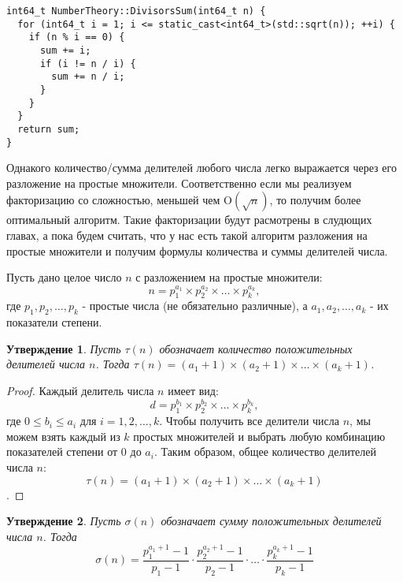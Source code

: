 \documentclass[12pt, a4paper, openany]{book}
\newtheorem*{statement}{Утверждение}
\begin{document}
\newpage
\begin{lstlisting}[breaklines=true]
int64_t NumberTheory::DivisorsSum(int64_t n) {
  for (int64_t i = 1; i <= static_cast<int64_t>(std::sqrt(n)); ++i) {
    if (n % i == 0) {
      sum += i;
      if (i != n / i) {
        sum += n / i;
      }
    }
  }
  return sum;
}
\end{lstlisting}

Однакого количество/сумма делителей любого числа легко выражается через его разложение на простые множители. Соответственно если мы реализуем факторизацию со сложностью, меньшей чем $\text{O}(\sqrt{n})$, то получим более оптимальный алгоритм. Такие факторизации будут расмотрены в слудющих главах, а пока будем считать, что у нас есть такой алгоритм разложения на простые множители и получим формулы количества и суммы делителей числа.

\noindent
Пусть дано целое число $ n $ с разложением на простые множители:
\[n = p_1^{a_1} \times p_2^{a_2} \times \ldots \times p_k^{a_k},\]
\noindent
где $ p_1, p_2, \ldots, p_k $ - простые числа (не обязательно различные), а $ a_1, a_2, \ldots, a_k $ - их показатели степени.

\begin{statement}
Пусть $\tau(n)$ обозначает количество положительных делителей числа $n$. Тогда $\tau(n) = (a_1 + 1) \times (a_2 + 1) \times \ldots \times (a_k + 1)$.
\end{statement}

\begin{proof}
Каждый делитель числа $ n $ имеет вид:
\[ d = p_1^{b_1} \times p_2^{b_2} \times \ldots \times p_k^{b_k},\]
\noindent
где $ 0 \leq b_i \leq a_i $ для $ i = 1, 2, \ldots, k $. Чтобы получить все делители числа $ n $, мы можем взять каждый из $ k $ простых множителей и выбрать любую комбинацию показателей степени от 0 до $ a_i $. Таким образом, общее количество делителей числа $ n $:
\begin{equation}\tau(n) = (a_1 + 1) \times (a_2 + 1) \times \ldots \times (a_k + 1)\end{equation}.
\end{proof}

\newpage

\begin{statement}
Пусть $\sigma(n)$ обозначает сумму положительных делителей числа $n$. Тогда \begin{equation}
\sigma(n) = \frac{{p_1^{a_1+1} - 1}}{{p_1 - 1}} \cdot \frac{{p_2^{a_2+1} - 1}}{{p_2 - 1}} \cdot \ldots \cdot \frac{{p_k^{a_k+1} - 1}}{{p_k - 1}}
\end{equation}
\end{statement}
\end{document}
